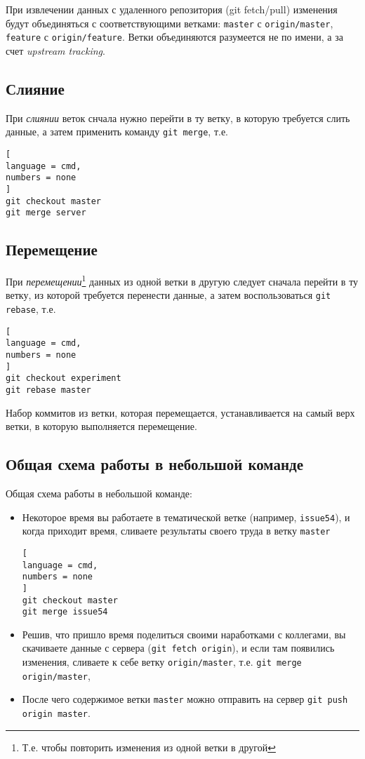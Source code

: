 \documentclass[%
	11pt,
	a4paper,
	utf8,
		]{article}
\begin{document}
При извлечении данных с удаленного репозитория (git fetch/pull) изменения будут объединяться с соответствующими ветками: \texttt{master} с \texttt{origin/master}, \texttt{feature} с \texttt{origin/feature}. Ветки объединяются разумеется не по имени, а за счет \emph{upstream tracking}. 

\subsection{Слияние}

При \emph{слиянии} веток снчала нужно перейти в ту ветку, в которую требуется слить данные, а затем применить команду \texttt{git merge}, т.е.

\begin{lstlisting}[
language = cmd,
numbers = none
]
git checkout master
git merge server
\end{lstlisting}

\subsection{Перемещение}

При \emph{перемещении}\footnote{Т.е. чтобы повторить изменения из одной ветки в другой} данных из одной ветки в другую следует сначала перейти в ту ветку, из которой требуется перенести данные, а затем воспользоваться \texttt{git rebase}, т.е.

\begin{lstlisting}[
language = cmd,
numbers = none
]
git checkout experiment
git rebase master
\end{lstlisting}

Набор коммитов из ветки, которая перемещается, устанавливается на самый верх ветки, в которую выполняется перемещение.

\subsection{Общая схема работы в небольшой команде}

Общая схема работы в небольшой команде:
\begin{itemize}
	\item Некоторое время вы работаете в тематической ветке (например, \texttt{issue54}), и когда приходит время, сливаете результаты своего труда в ветку \texttt{master}
	
\begin{lstlisting}[
language = cmd,
numbers = none
]
git checkout master
git merge issue54
\end{lstlisting}
	
	\item Решив, что пришло время поделиться своими наработками с коллегами, вы скачиваете данные с сервера (\texttt{git fetch origin}), и если там появились изменения, сливаете к себе ветку \texttt{origin/master}, т.е. \texttt{git merge origin/master},
	
	\item После чего содержимое ветки \texttt{master} можно отправить на сервер \texttt{git push origin master}.
\end{itemize}
\end{document}
